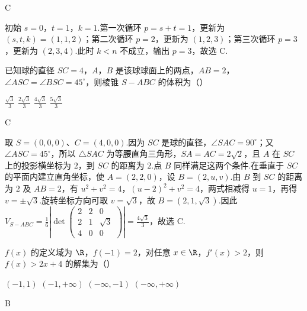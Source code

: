 \begin{answer}
C
\end{answer}

\begin{solution}
初始 \(s=0\)，\(t=1\)，\(k=1\).第一次循环 \(p=s+t=1\)，更新为 \((s,t,k)=(1,1,2)\)；第二次循环 \(p=2\)，更新为 \((1,2,3)\)；第三次循环 \(p=3\)，更新为 \((2,3,4)\).此时 \(k<n\) 不成立，输出 \(p=3\)，故选 C.
\end{solution}

\begin{problem}
已知球的直径 \(SC = 4\)，\(A\)，\(B\) 是该球球面上的两点，\(AB = 2\)，\(\angle ASC = \angle BSC = 45^\circ\)，则棱锥 \(S-ABC\) 的体积为（\quad）

\choices
    {\(\frac{\sqrt{3}}{3}\)}
    {\(\frac{2\sqrt{3}}{3}\)}
    {\(\frac{4\sqrt{3}}{3}\)}
    {\(\frac{5\sqrt{3}}{3}\)}
\end{problem}

\begin{answer}
C
\end{answer}

\begin{solution}
取 \(S=(0,0,0)\)、\(C=(4,0,0)\).因为 \(SC\) 是球的直径，\(\angle SAC=90^\circ\)；又 \(\angle ASC=45^\circ\)，所以 \(\triangle SAC\) 为等腰直角三角形，\(SA=AC=2\sqrt2\)，且 \(A\) 在 \(SC\) 上的投影横坐标为 \(2\)，到 \(SC\) 的距离为 \(2\).点 \(B\) 同样满足这两个条件.在垂直于 \(SC\) 的平面内建立直角坐标，使 \(A=(2,2,0)\)，设 \(B=(2,u,v)\).由 \(B\) 到 \(SC\) 的距离为 \(2\) 及 \(AB=2\)，有
\(\displaystyle u^2+v^2=4\)，\((u-2)^2+v^2=4\)，两式相减得 \(u=1\)，再得 \(v=\pm\sqrt3\).旋转坐标方向可取 \(v=\sqrt3\)，故 \(B=(2,1,\sqrt3)\).因此
\(\displaystyle V_{S-ABC}=\frac16\left|\det\begin{pmatrix}2&2&0\\2&1&\sqrt3\\4&0&0\end{pmatrix}\right|
=\frac{4\sqrt3}{3}\)，故选 C.
\end{solution}

\begin{problem}
\(f(x)\) 的定义域为 \(\R\)，\(f(-1) = 2\)，对任意 \(x \in \R\)，\(f'(x) > 2\)，则 \(f(x) > 2x + 4\) 的解集为（\quad）

\choices
    {\((-1,1)\)}
    {\((-1,+\infty)\)}
    {\((-\infty,-1)\)}
    {\((-\infty,+\infty)\)}
\end{problem}

\begin{answer}
B
\end{answer}

